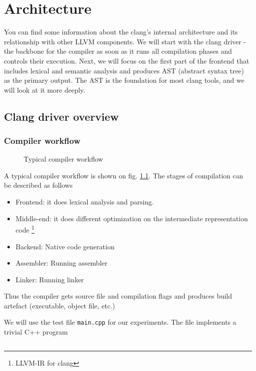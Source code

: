 \chapter{Architecture}
You can find some information about the clang’s internal architecture and its
relationship with other LLVM components. We will start with the clang driver -
the backbone for the compiler as soon as it runs all compilation phases and
controls their execution. Next, we will focus on the first part of the frontend
that includes lexical and semantic analysis and produces AST (abstract syntax
tree) as the primary output. The AST is the foundation for most clang tools, and
we will look at it more deeply. 

\section{Clang driver overview}

\subsection{Compiler workflow}

\begin{figure}
\begin{center}
\end{center}
  \caption{Typical compiler workflow}
  \label{fig:compiler_workflow}
\end{figure}
A typical compiler workflow is shown on fig. \ref{fig:compiler_workflow}. The
stages of compilation can be described as follows
\begin{itemize}
\item Frontend: it does lexical analysis and parsing.
\item Middle-end: it does different optimization on the intermediate
  representation code \footnote{LLVM-IR for clang}
\item Backend: Native code generation
\item Assembler: Running assembler
\item Linker: Running linker
\end{itemize}

Thus the compiler gets source file and compilation flags and produces build
artefact (executable, object file, etc.)


We will use the test file \texttt{main.cpp} for our experiments. The
file implements a trivial C++ program
\inputminted{c++}{./src/simple/main.cpp}

